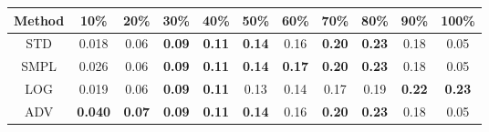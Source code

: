 \documentclass{standalone}
\begin{document}
\begin{tabular}{c|cccccccccc}
      \toprule
      Method & 10\% & 20\% & 30\% & 40\% & 50\% & 60\% & 70\% & 80\% & 90\% & 100\% \\
      \midrule
STD & 0.018 & 0.06 & \textbf{0.09} & \textbf{0.11} & \textbf{0.14} & 0.16 & \textbf{0.20} & \textbf{0.23} & 0.18 & 0.05\\
SMPL & 0.026 & 0.06 & \textbf{0.09} & \textbf{0.11} & \textbf{0.14} & \textbf{0.17} & \textbf{0.20} & \textbf{0.23} & 0.18 & 0.05\\
LOG & 0.019 & 0.06 & \textbf{0.09} & \textbf{0.11} & 0.13 & 0.14 & 0.17 & 0.19 & \textbf{0.22} & \textbf{0.23}\\
ADV & \textbf{0.040} & \textbf{0.07} & \textbf{0.09} & \textbf{0.11} & \textbf{0.14} & 0.16 & \textbf{0.20} & \textbf{0.23} & 0.18 & 0.05\\
  \bottomrule
\end{tabular}
\end{document}
